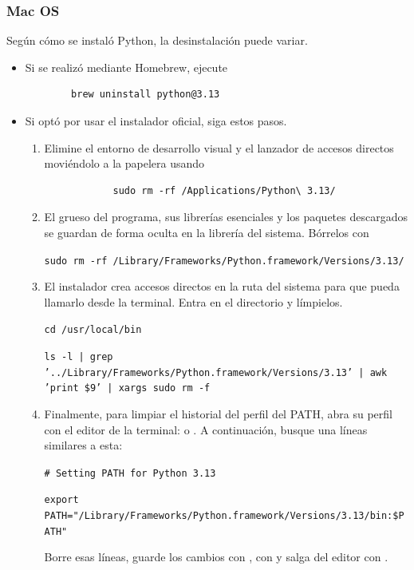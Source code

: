 \documentclass[a4paper,12pt,twoside,final]{book}
\begin{document}
\subsubsection{Mac OS}
Según cómo se instaló Python, la desinstalación puede variar.
\begin{itemize}
    \item Si se realizó mediante Homebrew, ejecute
    \begin{verbatim}
        brew uninstall python@3.13
    \end{verbatim}
    \item Si optó por usar el instalador oficial, siga estos pasos.
    \begin{enumerate}
        \item Elimine el entorno de desarrollo visual y el lanzador de accesos directos moviéndolo a la papelera usando
        \begin{verbatim}
            sudo rm -rf /Applications/Python\ 3.13/
        \end{verbatim}
        \item El grueso del programa, sus librerías esenciales y los paquetes descargados se guardan de forma oculta en la
        librería del sistema. Bórrelos con

        \texttt{sudo rm -rf /Library/Frameworks/Python.framework/Versions/3.13/}
        \item El instalador crea accesos directos en la ruta del sistema para que pueda llamarlo desde la terminal. Entra
        en el directorio y límpielos.
        
        \texttt{cd /usr/local/bin}

        \texttt{ls -l | grep '../Library/Frameworks/Python.framework/Versions/3.13' | awk '{print \$9}' | xargs sudo rm -f}
        \item Finalmente, para limpiar el historial del perfil del PATH, abra su perfil con el editor de la terminal:
         o . A continuación, busque una líneas similares a esta:

        \texttt{\# Setting PATH for Python 3.13}

        \texttt{export PATH="/Library/Frameworks/Python.framework/Versions/3.13/bin:\${PATH}"}

        Borre esas líneas, guarde los cambios con , con  y salga del editor con
        .
    \end{enumerate}
\end{itemize}
\end{document}
